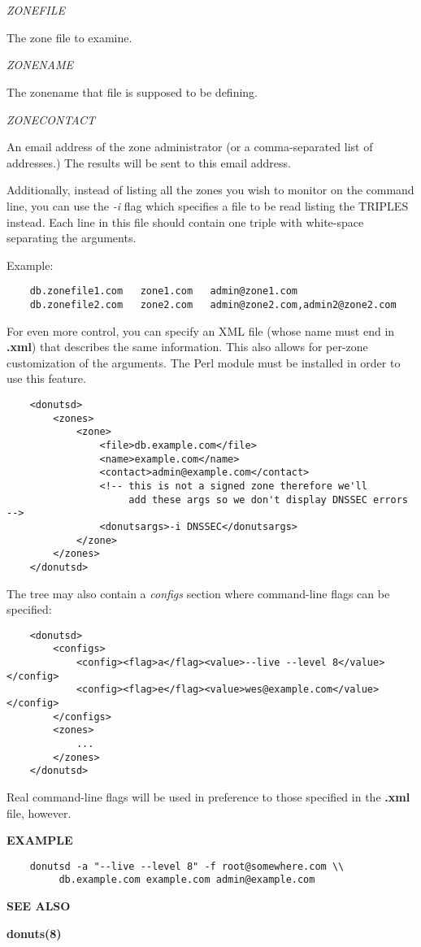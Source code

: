 \begin{description}

\item {\it ZONEFILE}\verb" "

The zone file to examine.

\item {\it ZONENAME}\verb" "

The zonename that file is supposed to be defining.

\item {\it ZONECONTACT}\verb" "

An email address of the zone administrator (or a comma-separated
list of addresses.)  The results will be sent to this email address.

\end{description}

Additionally, instead of listing all the zones you wish to monitor on
the command line, you can use the {\it -i} flag which specifies a
file to be read listing the TRIPLES instead.  Each line in this file
should contain one triple with white-space separating the arguments.

Example:

\begin{verbatim}
    db.zonefile1.com   zone1.com   admin@zone1.com
    db.zonefile2.com   zone2.com   admin@zone2.com,admin2@zone2.com
\end{verbatim}

For even more control, you can specify an XML file (whose name must end in
{\bf .xml}) that describes the same information.  This also allows for per-zone
customization of the  arguments.  The  Perl
module must be installed in order to use this feature.

\begin{verbatim}
    <donutsd>
        <zones>
            <zone>
                <file>db.example.com</file>
                <name>example.com</name>
                <contact>admin@example.com</contact>
                <!-- this is not a signed zone therefore we'll
                     add these args so we don't display DNSSEC errors -->
                <donutsargs>-i DNSSEC</donutsargs>
            </zone>
        </zones>
    </donutsd>
\end{verbatim}

The  tree may also contain a {\it configs} section where
command-line flags can be specified:

\begin{verbatim}
    <donutsd>
        <configs>
            <config><flag>a</flag><value>--live --level 8</value></config>
            <config><flag>e</flag><value>wes@example.com</value></config>
        </configs>
        <zones>
            ...
        </zones>
    </donutsd>
\end{verbatim}

Real command-line flags will be used in preference to those specified
in the {\bf .xml} file, however.

{\bf EXAMPLE}

\begin{verbatim}
    donutsd -a "--live --level 8" -f root@somewhere.com \\
         db.example.com example.com admin@example.com
\end{verbatim}

{\bf SEE ALSO}

{\bf donuts(8)}
